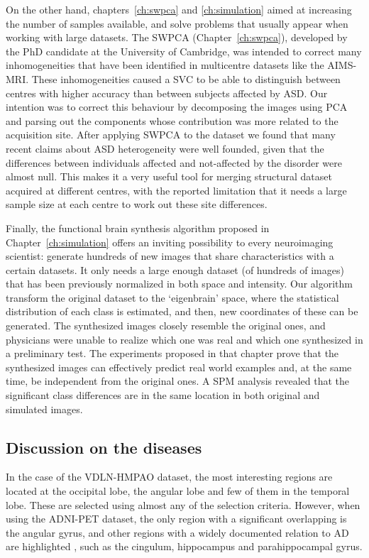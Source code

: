On the other hand, chapters~\ref{ch:swpca} and \ref{ch:simulation} aimed at increasing the number of samples available, and solve problems that usually appear when working with large datasets. The \ac{SWPCA} (Chapter~\ref{ch:swpca}), developed by the PhD candidate at the University of Cambridge, was intended to correct many inhomogeneities that have been identified in multicentre datasets like the AIMS-MRI. These inhomogeneities caused a \ac{SVC} to be able to distinguish between centres with higher accuracy than between subjects affected by \ac{ASD}. Our intention was to correct this behaviour by decomposing the images using \ac{PCA} and parsing out the components whose contribution was more related to the acquisition site. After applying \ac{SWPCA} to the dataset we found that many recent claims about \ac{ASD} heterogeneity \cite{haar2014anatomical} were well founded, given that the differences between individuals affected and not-affected by the disorder were almost null. This makes it a very useful tool for merging structural dataset acquired at different centres, with the reported limitation that it needs a large sample size at each centre to work out these site differences. 

Finally, the functional brain synthesis algorithm proposed in Chapter~\ref{ch:simulation} offers an inviting possibility to every neuroimaging scientist: generate hundreds of new images that share characteristics with a certain datasets. It only needs a large enough dataset (of hundreds of images) that has been previously normalized in both space and intensity. Our algorithm transform the original dataset to the `eigenbrain' space, where the statistical distribution of each class is estimated, and then, new coordinates of these can be generated. The synthesized images closely resemble the original ones, and physicians were unable to realize which one was real and which one synthesized in a preliminary test. The experiments proposed in that chapter prove that the synthesized images can effectively predict real world examples and, at the same time, be independent from the original ones. A \ac{SPM} analysis revealed that the significant class differences are in the same location in both original and simulated images. 




\subsection{Discussion on the diseases}
In the case of the VDLN-HMPAO dataset, the most interesting regions are located at the occipital lobe, the angular lobe and few of them in the temporal lobe. These are selected using almost any of the selection criteria. However, when using the ADNI-PET dataset, the only region with a significant overlapping is the angular gyrus, and other regions with a widely documented relation to \ac{AD} are highlighted \cite{Dubois2007,Claus1994}, such as the cingulum, hippocampus and parahippocampal gyrus. 

